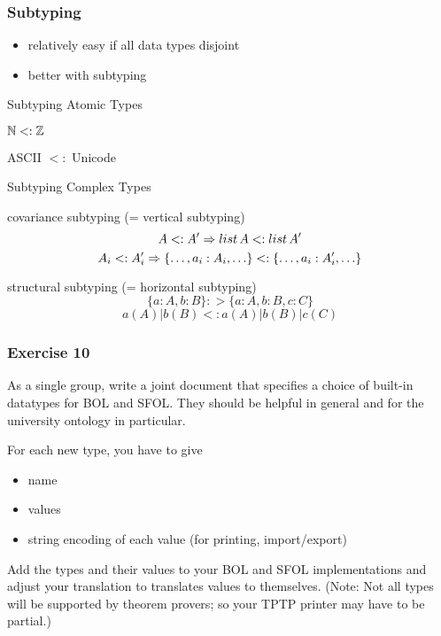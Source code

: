 \begin{frame}\frametitle{Subtyping}
\begin{itemize}
 \item relatively easy if all data types disjoint
 \item better with subtyping
\end{itemize}

\begin{blockitems}{Subtyping Atomic Types}
 \item $\mathbb{N} <: \mathbb{Z}$
 \item ASCII $<:$ Unicode
\end{blockitems}

\begin{blockitems}{Subtyping Complex Types}
 \item covariance subtyping (= vertical subtyping)
  \[A <: A' \Rightarrow list\,A <: list\, A'\]
  \[A_i <: A_i' \Rightarrow \{\ldots, a_i:A_i,\ldots\} <: \{\ldots, a_i:A'_i,\ldots\}\]
 \item structural subtyping (= horizontal subtyping)
  \[\{a:A,b:B\} :> \{a:A,b:B,c:C\}\]
  \[a(A)|b(B) <: a(A)|b(B)|c(C)\]
\end{blockitems}
\end{frame}

\begin{frame}\frametitle{Exercise 10}
As a single group, write a joint document that specifies a choice of built-in datatypes for BOL and SFOL.
They should be helpful in general and for the university ontology in particular.

For each new type, you have to give
\begin{itemize}
\item name
\item values
\item string encoding of each value (for printing, import/export)
\end{itemize}

Add the types and their values to your BOL and SFOL implementations and adjust your translation to translates values to themselves.
(Note: Not all types will be supported by theorem provers; so your TPTP printer may have to be partial.)
\end{frame}

